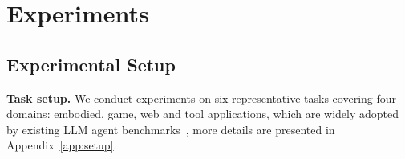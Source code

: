 
\section{Experiments}
\subsection{Experimental Setup}
\textbf{Task setup.}
We conduct experiments on six representative tasks covering four domains: embodied, game, web and tool applications, which are widely adopted by existing LLM agent benchmarks~\citep{ma2024agentboard,xi2024agentgym}, more details are presented in Appendix~\ref{app:setup}.


